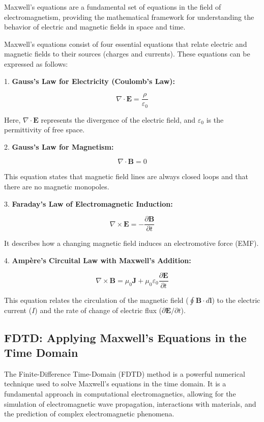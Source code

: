 \documentclass[11pt, a4paper, titlepage]{article}
\begin{document}
Maxwell's equations are a fundamental set of equations in the field of electromagnetism, providing the mathematical framework for understanding the behavior of electric and magnetic fields in space and time.

Maxwell's equations consist of four essential equations that relate electric and magnetic fields to their sources (charges and currents). These equations can be expressed as follows:
\begin{center}
	1. \textbf{Gauss's Law for Electricity (Coulomb's Law):}
	
	\[
	\nabla \cdot \mathbf{E} = \frac{\rho}{\varepsilon_0}
	\]
	
	Here, \(\nabla \cdot \mathbf{E}\) represents the divergence of the electric field, and \(\varepsilon_0\) is the permittivity of free space.
\end{center}
\begin{center}
	2. \textbf{Gauss's Law for Magnetism:}
	
	\[
	\nabla \cdot \mathbf{B} = 0
	\]
	
	This equation states that magnetic field lines are always closed loops and that there are no magnetic monopoles.
\end{center}
\begin{center}
	3. \textbf{Faraday's Law of Electromagnetic Induction:}
	
	\[
	\nabla \times \mathbf{E} = -\frac{\partial \mathbf{B}}{\partial t}
	\]
	
	It describes how a changing magnetic field induces an electromotive force (EMF).
\end{center}
\begin{center}
	4. \textbf{Ampère's Circuital Law with Maxwell's Addition:}
	
	\[
	\nabla \times \mathbf{B} = \mu_0 \mathbf{J} + \mu_0 \varepsilon_0 \frac{\partial \mathbf{E}}{\partial t}
	\]
	
	This equation relates the circulation of the magnetic field (\(\oint \mathbf{B} \cdot d\mathbf{l}\)) to the electric current (\(I\)) and the rate of change of electric flux (\(\partial \mathbf{E}/\partial t\)). 
\end{center}

\newpage
\subsection{FDTD: Applying Maxwell's Equations in the Time Domain}

The Finite-Difference Time-Domain (FDTD) method is a powerful numerical technique used to solve Maxwell's equations in the time domain. It is a fundamental approach in computational electromagnetics, allowing for the simulation of electromagnetic wave propagation, interactions with materials, and the prediction of complex electromagnetic phenomena.
\end{document}
